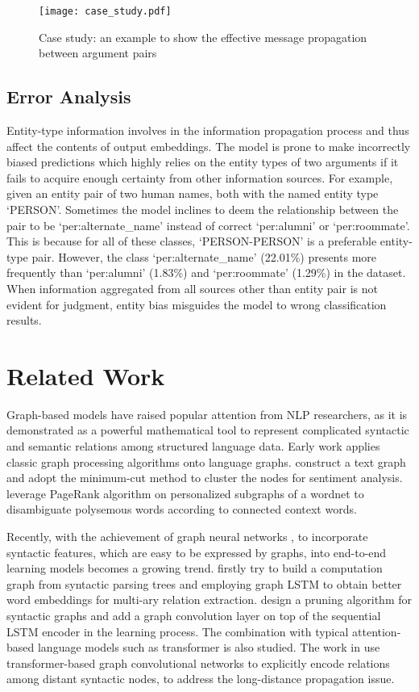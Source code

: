 \documentclass[letterpaper]{article} \usepackage{aaai21}  \usepackage{times}  \usepackage{helvet} \usepackage{courier}  \usepackage[hyphens]{url}  \usepackage{graphicx} \urlstyle{rm} \def\UrlFont{\rm}  \usepackage{natbib}  \usepackage{caption} \frenchspacing  \setlength{\pdfpagewidth}{8.5in}  \setlength{\pdfpageheight}{11in}
\begin{document}
\begin{figure}[t]
\centering
\texttt{[image: case\_study.pdf]} \caption{Case study: an example to show the effective message propagation between argument pairs}
\label{case_study}
\end{figure}

\subsection{Error Analysis}
Entity-type information involves in the information propagation process and thus affect the contents of output embeddings.
The model is prone to make incorrectly biased predictions which highly relies on the entity types of two arguments if it fails to acquire enough certainty from other information sources.
For example, given an entity pair of two human names, both with the named entity type `PERSON'.
Sometimes the model inclines to deem the relationship between the pair to be `per:alternate\_name' instead of correct `per:alumni' or `per:roommate'.
This is because for all of these classes, `PERSON-PERSON' is a preferable entity-type pair.
However, the class `per:alternate\_name' (22.01\%) presents more frequently than `per:alumni' (1.83\%) and `per:roommate' (1.29\%) in the dataset.
When information aggregated from all sources other than entity pair is not evident for judgment, entity bias misguides the model to wrong classification results.




\section{Related Work}
\label{related-work}


Graph-based models have raised popular attention from NLP researchers, as it is demonstrated as a powerful mathematical tool to represent complicated syntactic and semantic relations among structured language data.
Early work applies classic graph processing algorithms onto language graphs. \citet{pang2004sentimental} construct a text graph and adopt the minimum-cut method to cluster the nodes for sentiment analysis. \citet{agirre2009personalizing} leverage PageRank algorithm on personalized subgraphs of a wordnet to disambiguate polysemous words according to connected context words.

Recently, with the achievement of graph neural networks \cite{kipf2016semi}, to incorporate syntactic features, which are easy to be expressed by graphs, into end-to-end learning models becomes a growing trend.
\citet{peng2017cross} firstly try to build a computation graph from syntactic parsing trees and employing graph LSTM to obtain better word embeddings for multi-ary relation extraction.
\citet{zhang2018graph} design a pruning algorithm for syntactic graphs and add a graph convolution layer on top of the sequential LSTM encoder in the learning process.
The combination with typical attention-based language models such as transformer \cite{vaswani2017attention} is also studied.
The work in \cite{cai2020graph,yao2020heterogeneous} use transformer-based graph convolutional networks to explicitly encode relations among distant syntactic nodes, to address the long-distance propagation issue.
\end{document}

